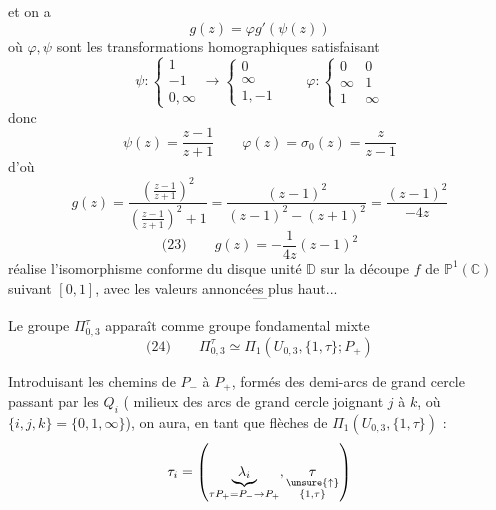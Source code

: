 et on a
\[
g(z)=\varphi g'(\psi(z))
\]
où $\varphi,\psi$ sont les transformations homographiques satisfaisant
\[
\psi:\left\{\begin{array}{c}1\\-1\\0,\infty\end{array}\right.
\longrightarrow
\left\{\begin{array}{c}0\\\infty\\1,-1\end{array}\right.
\qquad
\varphi:\left\{\begin{array}{cc}0&0\\\infty&1\\1&\infty\end{array}\right.
\]
donc \deleted{$\unsure{\varphi}$}
\[
\psi(z)=\frac{z-1}{z+1}\qquad
\varphi(z)=\sigma_0(z)=\frac{z}{z-1}
\]
d'où
\[
g(z)=\frac{\left(\frac{z-1}{z+1}\right)^2}{\left(\frac{z-1}{z+1}\right)^2+1}
=\frac{(z-1)^2}{(z-1)^2-(z+1)^2}
=\frac{(z-1)^2}{-4z}
\]
\[
\text{(23)}\qquad g(z)=-\frac1{4z}(z-1)^2
\]
réalise l'isomorphisme conforme du disque unité $\mathbb D$ sur la découpe $f$ de $\mathbb P^1(\mathbb C)$ suivant $[0,1]$, avec les valeurs annoncées plus haut...
\[
\text{---}
\]

Le groupe $\Pi_{0,3}^{\tau}$ apparaît comme groupe fondamental mixte
\[
\text{(24)}\qquad
\Pi_{0,3}^{\tau}\simeq\Pi_1(U_{0,3},\{1,\tau\};P_+)
\]

Introduisant les chemins  de $P_-$ à $P_+$, formés des demi-arcs de grand cercle passant par les $Q_i$ ( milieux des arcs de grand cercle joignant $j$ à $k$, où $\{i,j,k\}=\{0,1,\infty\}$), on aura, en tant que flèches de $\Pi_1(U_{0,3},\{1,\tau\})$ :
\[
\tau_i=\left(\underbrace{\lambda_i}_{\tau P_+=P_-\to P_+},
\underset{\substack{\unsure{\uparrow}\\\{1,\tau\}}}{\tau}\right)
\]
